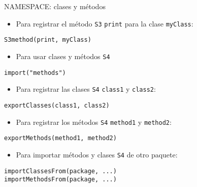 \documentclass[xcolor={usenames,svgnames,dvipsnames}]{beamer}
\begin{document}
\begin{frame}[label={sec:orgaf2c45a},fragile]{NAMESPACE: clases y métodos}
 \begin{itemize}
\item Para registrar el método \texttt{S3} \texttt{print} para la clase \texttt{myClass}:
\end{itemize}
\lstset{language=r,label= ,caption= ,captionpos=b,numbers=none}
\begin{lstlisting}
S3method(print, myClass)
\end{lstlisting}
\begin{itemize}
\item Para usar clases y métodos \texttt{S4}
\end{itemize}
\lstset{language=r,label= ,caption= ,captionpos=b,numbers=none}
\begin{lstlisting}
import("methods")
\end{lstlisting}
\begin{itemize}
\item Para registrar las clases \texttt{S4} \texttt{class1} y \texttt{class2}:
\end{itemize}
\lstset{language=r,label= ,caption= ,captionpos=b,numbers=none}
\begin{lstlisting}
exportClasses(class1, class2)
\end{lstlisting}
\begin{itemize}
\item Para registrar los métodos \texttt{S4} \texttt{method1} y \texttt{method2}:
\end{itemize}
\lstset{language=r,label= ,caption= ,captionpos=b,numbers=none}
\begin{lstlisting}
exportMethods(method1, method2)
\end{lstlisting}
\begin{itemize}
\item Para importar métodos y clases \texttt{S4} de otro paquete:
\end{itemize}
\lstset{language=r,label= ,caption= ,captionpos=b,numbers=none}
\begin{lstlisting}
importClassesFrom(package, ...)
importMethodsFrom(package, ...)
\end{lstlisting}
\end{frame}
\end{document}
